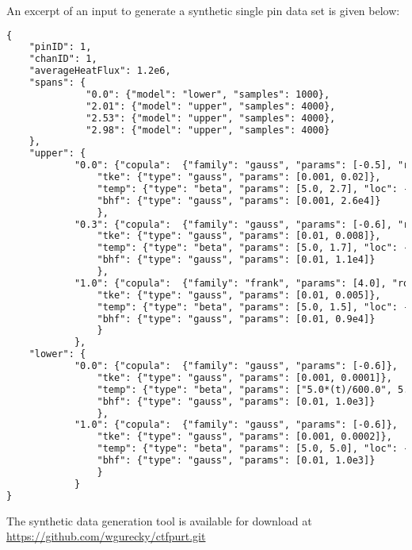 An excerpt of an input to generate a synthetic single pin data set is given below:
\tiny
\begin{lstlisting}[language=XML]
{
    "pinID": 1,
    "chanID": 1,
    "averageHeatFlux": 1.2e6,
    "spans": {
              "0.0": {"model": "lower", "samples": 1000},
              "2.01": {"model": "upper", "samples": 4000},
              "2.53": {"model": "upper", "samples": 4000},
              "2.98": {"model": "upper", "samples": 4000}
    },
    "upper": {
            "0.0": {"copula":  {"family": "gauss", "params": [-0.5], "rot": 0},
                "tke": {"type": "gauss", "params": [0.001, 0.02]},
                "temp": {"type": "beta", "params": [5.0, 2.7], "loc": -9.2, "scale": 12.0},
                "bhf": {"type": "gauss", "params": [0.001, 2.6e4]}
                },
            "0.3": {"copula":  {"family": "gauss", "params": [-0.6], "rot": 0},
                "tke": {"type": "gauss", "params": [0.01, 0.008]},
                "temp": {"type": "beta", "params": [5.0, 1.7], "loc": -7.0, "scale": 8.0},
                "bhf": {"type": "gauss", "params": [0.01, 1.1e4]}
                },
            "1.0": {"copula":  {"family": "frank", "params": [4.0], "rot": 1},
                "tke": {"type": "gauss", "params": [0.01, 0.005]},
                "temp": {"type": "beta", "params": [5.0, 1.5], "loc": -4.0, "scale": 5.0},
                "bhf": {"type": "gauss", "params": [0.01, 0.9e4]}
                }
            },
    "lower": {
            "0.0": {"copula":  {"family": "gauss", "params": [-0.6]},
                "tke": {"type": "gauss", "params": [0.001, 0.0001]},
                "temp": {"type": "beta", "params": ["5.0*(t)/600.0", 5.0], "loc": -2.0, "scale": 4.0},
                "bhf": {"type": "gauss", "params": [0.01, 1.0e3]}
                },
            "1.0": {"copula":  {"family": "gauss", "params": [-0.6]},
                "tke": {"type": "gauss", "params": [0.001, 0.0002]},
                "temp": {"type": "beta", "params": [5.0, 5.0], "loc": -2.0, "scale": 4.0},
                "bhf": {"type": "gauss", "params": [0.01, 1.0e3]}
                }
            }
}
\end{lstlisting}
\normalsize
The synthetic data generation tool is available for download at \url{https://github.com/wgurecky/ctfpurt.git}
